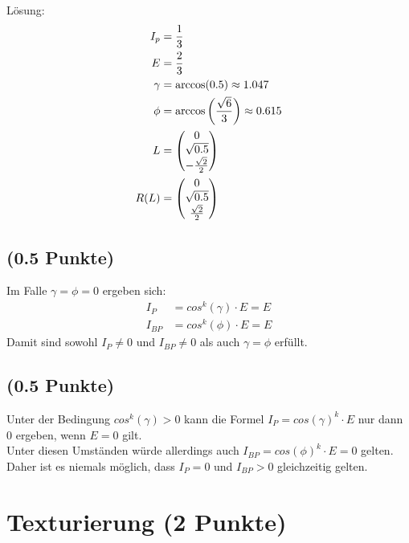 \documentclass[a4paper,10pt,DIV=14]{article}
\begin{document}
Lösung:
\begin{align*}
I_p &= \frac{1}{3}\\
E &= \frac{2}{3} \\
\gamma &= \arccos(0.5) \approx 1.047\\
\phi &= \arccos\left(\frac{\sqrt{6}}{3}\right) \approx 0.615 \\
L &=  \begin{pmatrix} 0 \\ \sqrt{0.5} \\ -\frac{\sqrt{2}}{2} \end{pmatrix} \\
R(L) &= \begin{pmatrix} 0 \\ \sqrt{0.5} \\ \frac{\sqrt{2}}{2} \end{pmatrix}\\
\end{align*}

\subsection{(0.5 Punkte)} %
Im Falle $\gamma = \phi = 0$ ergeben sich:
\begin{align*}
    I_P &= cos^k(\gamma) \cdot E = E\\
    I_{BP} &= cos^k(\phi) \cdot E = E
\end{align*}
Damit sind sowohl $I_P \neq 0$ und $I_{BP} \neq 0$ als auch $\gamma = \phi$ erf\"ullt.
\subsection{(0.5 Punkte)}
Unter der Bedingung $cos^k(\gamma) > 0$ kann die Formel $I_P = cos(\gamma)^k \cdot E$ nur dann $0$ ergeben, wenn $E=0$ gilt.\\
Unter diesen Umst\"anden w\"urde allerdings auch $I_{BP} = cos(\phi)^k \cdot E = 0$ gelten.\\
Daher ist es niemals m\"oglich, dass $I_P = 0$ und $I_{BP} > 0$ gleichzeitig gelten.



\section{Texturierung (2 Punkte)} %
\end{document}
